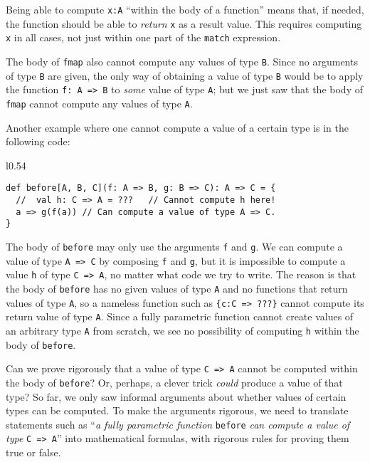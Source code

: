 Being able to compute \lstinline!x:A! ``within the body of a function''
means that, if needed, the function should be able to \emph{return}
\lstinline!x! as a result value. This requires computing \lstinline!x!
in all cases, not just within one part of the \lstinline!match! expression. 

The body of \lstinline!fmap! also cannot compute any values of type
\lstinline!B!. Since no arguments of type \lstinline!B! are given,
the only way of obtaining a value of type \lstinline!B! would be
to apply the function \lstinline!f: A => B! to \emph{some} value
of type \lstinline!A!; but we just saw that the body of \lstinline!fmap!
cannot compute any values of type \lstinline!A!.

Another example where one cannot compute a value of a certain type
is in the following code:

\begin{wrapfigure}{l}{0.54\columnwidth}%
\vspace{-0.1\baselineskip}
\begin{lstlisting}
def before[A, B, C](f: A => B, g: B => C): A => C = {
  //  val h: C => A = ???   // Cannot compute h here!
  a => g(f(a)) // Can compute a value of type A => C.
}
\end{lstlisting}

\vspace{-1.2\baselineskip}
\end{wrapfigure}%

\noindent The body of \lstinline!before! may only use the arguments
\lstinline!f! and \lstinline!g!. We can compute a value of type
\lstinline!A => C! by composing \lstinline!f! and \lstinline!g!,
but it is impossible to compute a value \lstinline!h! of type \lstinline!C => A!,
no matter what code we try to write. The reason is that the body of
\lstinline!before! has no given values of type \lstinline!A! and
no functions that return values of type \lstinline!A!, so a nameless
function such as \lstinline!{c:C => ???}! cannot compute its return
value of type \lstinline!A!. Since a fully parametric function cannot
create values of an arbitrary type \lstinline!A! from scratch, we
see no possibility of computing \lstinline!h! within the body of
\lstinline!before!.

Can we prove rigorously that a value of type \lstinline!C => A! cannot
be computed within the body of \lstinline!before!? Or, perhaps, a
clever trick \emph{could} produce a value of that type? So far, we
only saw informal arguments about whether values of certain types
can be computed. To make the arguments rigorous, we need to translate
statements such as ``\emph{a fully parametric function} \lstinline!before!
\emph{can compute a value of type} \lstinline!C => A!'' into mathematical
formulas, with rigorous rules for proving them true or false.

